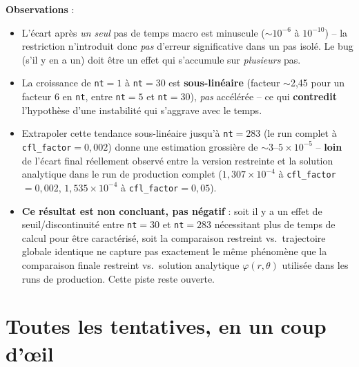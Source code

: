 \documentclass[11pt]{article}
\begin{document}
\textbf{Observations} :
\begin{itemize}
  \item L'écart après \emph{un seul} pas de temps macro est minuscule
  ($\sim10^{-6}$ à $10^{-10}$) -- la restriction n'introduit donc
  \emph{pas} d'erreur significative dans un pas isolé. Le bug (s'il y
  en a un) doit être un effet qui s'accumule sur \emph{plusieurs} pas.
  \item La croissance de \texttt{nt}$=1$ à \texttt{nt}$=30$ est
  \textbf{sous-linéaire} (facteur $\sim$2,45 pour un facteur 6 en
  \texttt{nt}, entre \texttt{nt}$=5$ et \texttt{nt}$=30$), \emph{pas}
  accélérée -- ce qui \textbf{contredit} l'hypothèse d'une instabilité
  qui s'aggrave avec le temps.
  \item Extrapoler cette tendance sous-linéaire jusqu'à
  \texttt{nt}$=283$ (le run complet à \texttt{cfl\_factor}$=0{,}002$)
  donne une estimation grossière de $\sim3$--$5\times10^{-5}$ --
  \textbf{loin} de l'écart final réellement observé entre la version
  restreinte et la solution analytique dans le run de production complet
  ($1{,}307\times10^{-4}$ à \texttt{cfl\_factor}$=0{,}002$,
  $1{,}535\times10^{-4}$ à \texttt{cfl\_factor}$=0{,}05$).
  \item \textbf{Ce résultat est non concluant, pas négatif} : soit il y
  a un effet de seuil/discontinuité entre \texttt{nt}$=30$ et
  \texttt{nt}$=283$ nécessitant plus de temps de calcul pour être
  caractérisé, soit la comparaison \og restreint vs.\ trajectoire
  globale identique \fg{} ne capture pas exactement le même phénomène
  que la comparaison finale \og restreint vs.\ solution analytique
  $\varphi(r,\theta)$ \fg{} utilisée dans les runs de production. Cette
  piste reste ouverte.
\end{itemize}

\section{Toutes les tentatives, en un coup d'œil}
\end{document}
